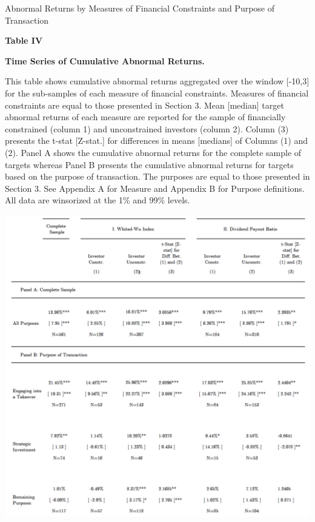 \documentclass[12pt]{article}
\begin{document}
\begin{table}[!htbp]
	\centering
	\captionsetup{textformat=empty,labelformat=blank}
	\caption{Abnormal Returns by Measures of Financial Constraints and Purpose of Transaction}
	\textbf{Table IV}\par\medskip
	\large\textbf{Time Series of Cumulative Abnormal Returns.}\par\medskip
	\justifying
	\footnotesize\noindent{}This table shows cumulative abnormal returns aggregated over the window [-10,3] for the sub-samples of each measure of financial constraints. Measures of financial constraints are equal to those presented in Section 3. Mean [median] target abnormal returns of each measure are reported for the sample of financially constrained (column 1) and unconstrained investors (column 2). Column (3) presents the t-stat [Z-stat.] for differences in means [medians] of Columns (1) and (2). Panel A shows the cumulative abnormal returns for the complete sample of targets whereas Panel B presents the cumulative abnormal returns for targets based on the purpose of transaction. The purposes are equal to those presented in Section 3. See Appendix A for Measure and Appendix B for Purpose definitions. All data are winsorized at the 1\% and 99\% levels.\par\medskip
	\centering													
	\begin{adjustbox}{width=\textwidth}
		\includegraphics{Measures1}
	\end{adjustbox}\par\medskip
\end{table}
\end{document}
